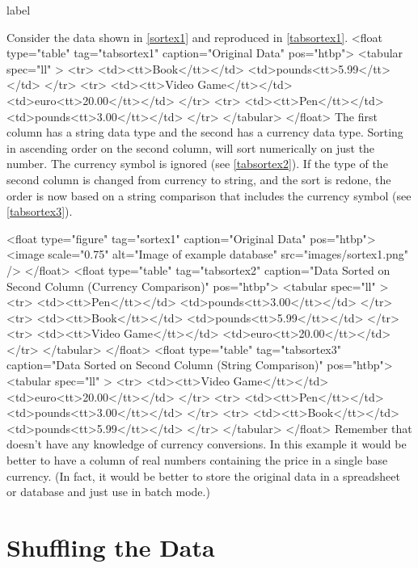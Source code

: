 \begin{example}{label}{}

   Consider the data shown in \autoref{sortex1} and reproduced in 
   \autoref{tabsortex1}.
   <float type="table" tag="tabsortex1" caption="Original Data" pos="htbp">
    <tabular spec="ll" >
     <tr>
      <td><tt>Book</tt></td>
      <td>\gls{pounds}<tt>5.99</tt></td>
     </tr>
     <tr>
      <td><tt>Video Game</tt></td>
      <td>\gls{euro}<tt>20.00</tt></td>
     </tr>
     <tr>
      <td><tt>Pen</tt></td>
      <td>\gls{pounds}<tt>3.00</tt></td>
     </tr>
    </tabular>
   </float>
   The first column has a string data type and the second has 
   a currency data type. Sorting in ascending order on the second column,
   will sort numerically on just the number. The currency symbol is ignored
   (see \autoref{tabsortex2}).
   If the type of the second column is changed from currency to string, and the
   sort is redone, the order is now based on a string comparison that
   includes the currency symbol (see \autoref{tabsortex3}).

   <float type="figure" tag="sortex1" caption="Original Data" pos="htbp">
      <image scale="0.75" alt="Image of example database" src="images/sortex1.png" />
   </float>
   <float type="table" tag="tabsortex2" caption="Data Sorted on Second Column (Currency Comparison)" pos="htbp">
    <tabular spec="ll" >
     <tr>
      <td><tt>Pen</tt></td>
      <td>\gls{pounds}<tt>3.00</tt></td>
     </tr>
     <tr>
      <td><tt>Book</tt></td>
      <td>\gls{pounds}<tt>5.99</tt></td>
     </tr>
     <tr>
      <td><tt>Video Game</tt></td>
      <td>\gls{euro}<tt>20.00</tt></td>
     </tr>
    </tabular>
   </float>
   <float type="table" tag="tabsortex3" caption="Data Sorted on Second Column (String Comparison)" pos="htbp">
    <tabular spec="ll" >
     <tr>
      <td><tt>Video Game</tt></td>
      <td>\gls{euro}<tt>20.00</tt></td>
     </tr>
     <tr>
      <td><tt>Pen</tt></td>
      <td>\gls{pounds}<tt>3.00</tt></td>
     </tr>
     <tr>
      <td><tt>Book</tt></td>
      <td>\gls{pounds}<tt>5.99</tt></td>
     </tr>
    </tabular>
   </float>
Remember that  doesn't have any knowledge of currency conversions.
   In this example it would be better to have a column of real numbers
   containing the price in a single base currency. (In fact, it would
   be better to store the original data in a spreadsheet or database
   and just use  in batch mode.)
\end{example}

\section{Shuffling the Data}\label{shuffle}

